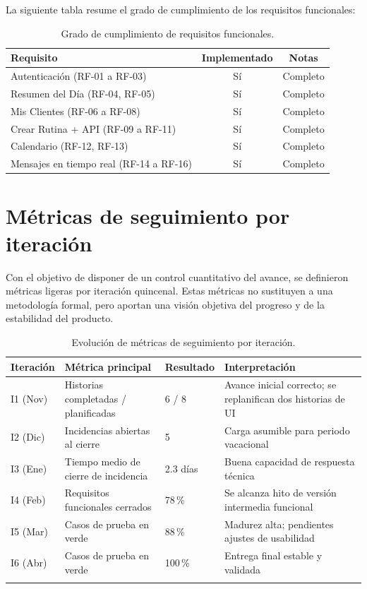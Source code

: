 La siguiente tabla resume el grado de cumplimiento de los requisitos funcionales:

\begin{table}[H]
\centering
\begin{tabular}{@{}lcc@{}}
\toprule
\textbf{Requisito} & \textbf{Implementado} & \textbf{Notas} \\
\midrule
Autenticación (RF-01 a RF-03) & Sí & Completo \\
Resumen del Día (RF-04, RF-05) & Sí & Completo \\
Mis Clientes (RF-06 a RF-08) & Sí & Completo \\
Crear Rutina + API (RF-09 a RF-11) & Sí & Completo \\
Calendario (RF-12, RF-13) & Sí & Completo \\
Mensajes en tiempo real (RF-14 a RF-16) & Sí & Completo \\
\bottomrule
\end{tabular}
\caption{Grado de cumplimiento de requisitos funcionales.}
\end{table}

\section{Métricas de seguimiento por iteración}

Con el objetivo de disponer de un control cuantitativo del avance, se definieron métricas ligeras por iteración quincenal. Estas métricas no sustituyen a una metodología formal, pero aportan una visión objetiva del progreso y de la estabilidad del producto.

\begin{longtable}{@{}p{2.2cm}p{3.2cm}p{3cm}p{5.6cm}@{}}
\toprule
\textbf{Iteración} & \textbf{Métrica principal} & \textbf{Resultado} & \textbf{Interpretación} \\
\midrule
\endhead
I1 (Nov) & Historias completadas / planificadas & 6 / 8 & Avance inicial correcto; se replanifican dos historias de UI \\
I2 (Dic) & Incidencias abiertas al cierre & 5 & Carga asumible para periodo vacacional \\
I3 (Ene) & Tiempo medio de cierre de incidencia & 2.3 días & Buena capacidad de respuesta técnica \\
I4 (Feb) & Requisitos funcionales cerrados & 78\,\% & Se alcanza hito de versión intermedia funcional \\
I5 (Mar) & Casos de prueba en verde & 88\,\% & Madurez alta; pendientes ajustes de usabilidad \\
I6 (Abr) & Casos de prueba en verde & 100\,\% & Entrega final estable y validada \\
\bottomrule
\caption{Evolución de métricas de seguimiento por iteración.}
\end{longtable}

